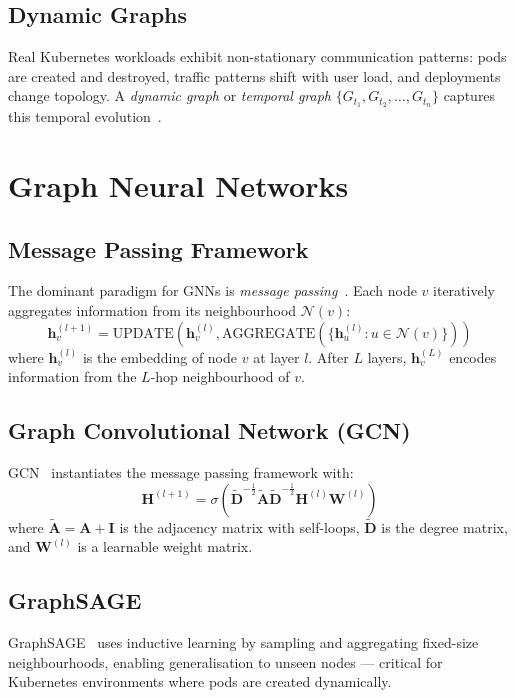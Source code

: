 \subsection{Dynamic Graphs}
Real Kubernetes workloads exhibit non-stationary communication patterns: pods are created
and destroyed, traffic patterns shift with user load, and deployments change topology.
A \emph{dynamic graph} or \emph{temporal graph} $\{G_{t_1}, G_{t_2}, \ldots, G_{t_n}\}$
captures this temporal evolution~\cite{kazemi2020representation}.

\section{Graph Neural Networks}
\label{sec:bg_gnns}

\subsection{Message Passing Framework}
The dominant paradigm for GNNs is \emph{message passing}~\cite{gilmer2017mpnn}. Each
node $v$ iteratively aggregates information from its neighbourhood $\mathcal{N}(v)$:
\begin{equation}
  \mathbf{h}_v^{(l+1)} = \text{UPDATE}\left(\mathbf{h}_v^{(l)},
    \text{AGGREGATE}\left(\{\mathbf{h}_u^{(l)} : u \in \mathcal{N}(v)\}\right)\right)
\end{equation}
where $\mathbf{h}_v^{(l)}$ is the embedding of node $v$ at layer $l$. After $L$ layers,
$\mathbf{h}_v^{(L)}$ encodes information from the $L$-hop neighbourhood of $v$.

\subsection{Graph Convolutional Network (GCN)}
GCN~\cite{kipf2017gcn} instantiates the message passing framework with:
\begin{equation}
  \mathbf{H}^{(l+1)} = \sigma\left(\tilde{\mathbf{D}}^{-\frac{1}{2}}
    \tilde{\mathbf{A}} \tilde{\mathbf{D}}^{-\frac{1}{2}} \mathbf{H}^{(l)} \mathbf{W}^{(l)}\right)
\end{equation}
where $\tilde{\mathbf{A}} = \mathbf{A} + \mathbf{I}$ is the adjacency matrix with
self-loops, $\tilde{\mathbf{D}}$ is the degree matrix, and $\mathbf{W}^{(l)}$ is a
learnable weight matrix.

\subsection{GraphSAGE}
GraphSAGE~\cite{hamilton2017graphsage} uses inductive learning by sampling and
aggregating fixed-size neighbourhoods, enabling generalisation to unseen nodes --- critical
for Kubernetes environments where pods are created dynamically.

